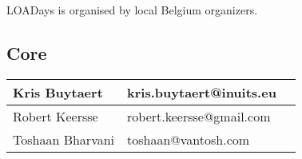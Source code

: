 
LOADays is organised by local Belgium organizers.

\subsection{Core}

\begin{longtable}{|p{6cm}|p{6cm}|p{5cm}|}
\hline
Kris Buytaert			&	kris.buytaert@inuits.eu			&		\\
\hline
Robert Keersse			&	robert.keersse@gmail.com		&		\\
\hline
Toshaan Bharvani		&	toshaan@vantosh.com				&		\\
\hline
\end{longtable}
